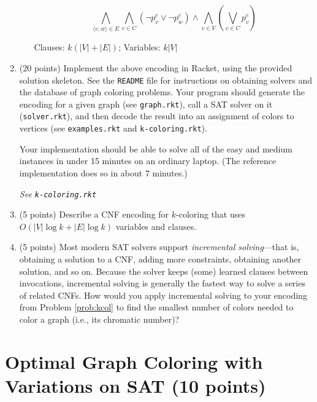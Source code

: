 \documentclass{article}
\newenvironment{solution}{\color{blue} \em }{}
\begin{document}
\begin{enumerate}
\begin{enumerate}
\begin{solution}
    $$\bigwedge_{\langle v, w \rangle \in E} \bigwedge_{c \in C} (\neg p_v^c \lor \neg p_w^c)
     \land \bigwedge_{v \in V} (\bigvee_{c \in C} p^c_v)  $$


     Clauses: $ k(|V| + |E|)$;
     Variables: $k|V|$

\end{solution}


\end{enumerate} \label{prob:encoding}

\item (20 points) \label{prob:kcol} Implement the above encoding in Racket, using the provided solution skeleton.  See the \texttt{README} file for instructions on obtaining solvers and the database of graph coloring problems.  Your program should generate the encoding for a given graph (see \texttt{graph.rkt}), call a SAT solver on it (\texttt{solver.rkt}), and then decode the result into an assignment of colors to vertices  (see \texttt{examples.rkt} and \texttt{k-coloring.rkt}).

Your implementation should be able to solve all of the easy and medium instances in under 15 minutes on an ordinary laptop.
(The reference implementation does so in about 7 minutes.)

\begin{solution}
	See \texttt{k-coloring.rkt}
\end{solution}

\item (5 points) Describe a CNF encoding for $k$-coloring that uses $O(|V|\log k+|E|\log k)$ variables and clauses.



\item (5 points) Most modern SAT solvers support \emph{incremental solving}---that is, obtaining a solution to a CNF, adding more constraints, obtaining another solution, and so on.  Because the solver keeps (some) learned clauses between invocations, incremental solving is  generally the fastest way to solve a series of related CNFs.  How would you apply incremental solving to your encoding from Problem \ref{prob:kcol} to find the smallest number of colors needed to color a graph (i.e., its chromatic number)?  \label{prob:last}


\end{enumerate}

\section{Optimal Graph Coloring with Variations on SAT (10 points)}\label{varsat}
\end{document}
